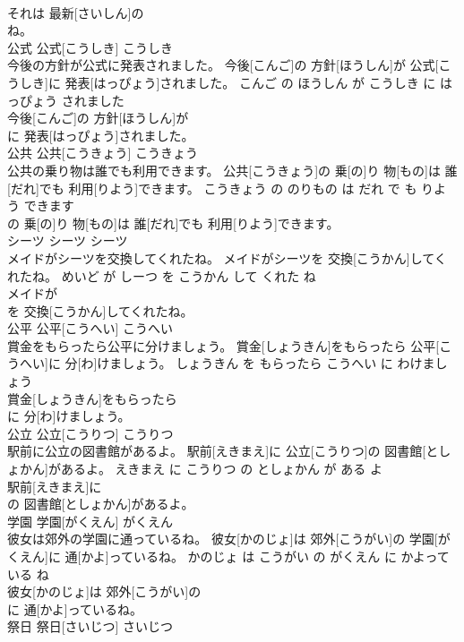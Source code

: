 \documentclass[8pt]{extreport}
\begin{document}
\begin{CJK}{UTF8}{min}
\\	それは 最新[さいしん]の
\\	ね。			
\\	公式	公式[こうしき]	こうしき	
\\	今後の方針が公式に発表されました。	今後[こんご]の 方針[ほうしん]が 公式[こうしき]に 発表[はっぴょう]されました。	こんご の ほうしん が こうしき に はっぴょう されました	
\\	今後[こんご]の 方針[ほうしん]が
\\	に 発表[はっぴょう]されました。			
\\	公共	公共[こうきょう]	こうきょう	
\\	公共の乗り物は誰でも利用できます。	公共[こうきょう]の 乗[の]り 物[もの]は 誰[だれ]でも 利用[りよう]できます。	こうきょう の のりもの は だれ で も りよう できます	
\\	の 乗[の]り 物[もの]は 誰[だれ]でも 利用[りよう]できます。			
\\	シーツ	シーツ	シーツ	
\\	メイドがシーツを交換してくれたね。	メイドがシーツを 交換[こうかん]してくれたね。	めいど が しーつ を こうかん して くれた ね	
\\	メイドが
\\	を 交換[こうかん]してくれたね。			
\\	公平	公平[こうへい]	こうへい	
\\	賞金をもらったら公平に分けましょう。	賞金[しょうきん]をもらったら 公平[こうへい]に 分[わ]けましょう。	しょうきん を もらったら こうへい に わけましょう	
\\	賞金[しょうきん]をもらったら
\\	に 分[わ]けましょう。			
\\	公立	公立[こうりつ]	こうりつ	
\\	駅前に公立の図書館があるよ。	駅前[えきまえ]に 公立[こうりつ]の 図書館[としょかん]があるよ。	えきまえ に こうりつ の としょかん が ある よ	
\\	駅前[えきまえ]に
\\	の 図書館[としょかん]があるよ。			
\\	学園	学園[がくえん]	がくえん	
\\	彼女は郊外の学園に通っているね。	彼女[かのじょ]は 郊外[こうがい]の 学園[がくえん]に 通[かよ]っているね。	かのじょ は こうがい の がくえん に かよって いる ね	
\\	彼女[かのじょ]は 郊外[こうがい]の
\\	に 通[かよ]っているね。			
\\	祭日	祭日[さいじつ]	さいじつ	

\end{CJK}
\end{document}
